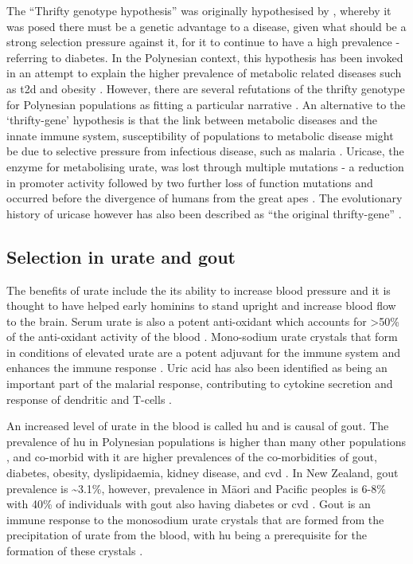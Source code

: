 \documentclass[]{report}
\newcommand{\tex}[1]{#1}
\begin{document}
The ``Thrifty genotype hypothesis'' was originally hypothesised by
\citet{Neel1962}, whereby it was posed there must be a genetic advantage
to a disease, given what should be a strong selection pressure against
it, for it to continue to have a high prevalence - referring to
diabetes. In the Polynesian context, this hypothesis has been invoked in
an attempt to explain the higher prevalence of metabolic related
diseases such as \gls{t2d} and obesity \citep{Myles2011, Minster2016}.
However, there are several refutations of the thrifty genotype for
Polynesian populations as fitting a particular narrative
\citep{Cadzow2016, Gosling2014, Gosling2015}. An alternative to the
`thrifty-gene' hypothesis is that the link between metabolic diseases
and the innate immune system, susceptibility of populations to metabolic
disease might be due to selective pressure from infectious disease, such
as malaria \citep{Gosling2015}. Uricase, the enzyme for metabolising
urate, was lost through multiple mutations - a reduction in promoter
activity followed by two further loss of function mutations and occurred
before the divergence of humans from the great apes \citep{Kratzer2014}.
The evolutionary history of uricase however has also been described as
``the original thrifty-gene'' \citep{Kratzer2014}.

\subsection{Selection in urate and
gout}\label{selection-in-urate-and-gout}

The benefits of urate include the its ability to increase blood pressure
and it is thought to have helped early hominins to stand upright
\citep{Watanabe2002} and increase blood flow to the brain. Serum urate
is also a potent anti-oxidant which accounts for \textgreater{}50\% of
the anti-oxidant activity of the blood
\citep{Glantzounis2005, Parmar2009}. Mono-sodium urate crystals that
form in conditions of elevated urate are a potent adjuvant for the
immune system and enhances the immune response
\citep{Ames1981, Opitz2009}. Uric acid has also been identified as being
an important part of the malarial response, contributing to cytokine
secretion and response of dendritic and T-cells
\citep{GallegoDelgado2014}.

An increased level of urate in the blood is called \gls{hu} and is
causal of gout. The prevalence of \gls{hu} in Polynesian populations is
higher than many other populations \citep{Gosling2014}, and co-morbid
with it are higher prevalences of the co-morbidities of gout, diabetes,
obesity, dyslipidaemia, kidney disease, and \gls{cvd}
\citep{Winnard2013}. In New Zealand, gout prevalence is
\textasciitilde{}3.1\%, however, prevalence in M\tex{\={a}}ori and
Pacific peoples is 6-8\% with 40\% of individuals with gout also having
diabetes or \gls{cvd} \citep{Winnard2013}. Gout is an immune response to
the monosodium urate crystals that are formed from the precipitation of
urate from the blood, with \gls{hu} being a prerequisite for the
formation of these crystals \citep{Merriman2011a}.
\end{document}
